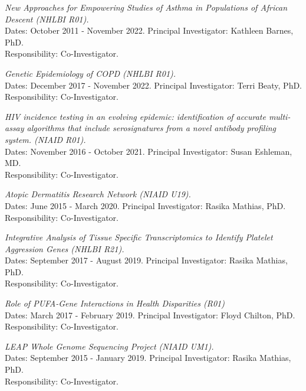 \documentclass[10pt]{article}
\newcommand{\dn}[1]{{\color{black} {#1}}}
\begin{document}
\item
{\it New Approaches for Empowering Studies of Asthma in Populations of African Descent (NHLBI R01).}\\[0.0em]
\dn{Dates:} October 2011 - November 2022.
\dn{Principal Investigator:} Kathleen Barnes, PhD.\\
\dn{Responsibility:} Co-Investigator.

\item
{\it Genetic Epidemiology of COPD (NHLBI R01).}\\[0.0em]
\dn{Dates:} December 2017 - November 2022.
\dn{Principal Investigator:} Terri Beaty, PhD.\\
\dn{Responsibility:} Co-Investigator.

\item
{\it HIV incidence testing in an evolving epidemic: identification of accurate multi-assay algorithms that include serosignatures from a novel antibody profiling system.
(NIAID R01).}\\[0.0em]
\dn{Dates:} November 2016 - October 2021.
\dn{Principal Investigator:} Susan Eshleman, MD.\\
\dn{Responsibility:} Co-Investigator.

\item
{\it Atopic Dermatitis Research Network (NIAID U19).}\\[0.0em]
\dn{Dates:} June 2015 - March 2020.
\dn{Principal Investigator:} Rasika Mathias, PhD.\\
\dn{Responsibility:} Co-Investigator.

\item
{\it Integrative Analysis of Tissue Specific Transcriptomics to Identify Platelet Aggression Genes (NHLBI R21).}\\[0.0em]
\dn{Dates:} September 2017 - August 2019.
\dn{Principal Investigator:} Rasika Mathias, PhD.\\
\dn{Responsibility:} Co-Investigator.

\item
{\it Role of PUFA-Gene Interactions in Health Disparities (R01)}\\[0.0em]
\dn{Dates:} March 2017 - February 2019.
\dn{Principal Investigator:} Floyd Chilton, PhD.\\
\dn{Responsibility:} Co-Investigator.

\item
{\it LEAP Whole Genome Sequencing Project (NIAID UM1).}\\[0.0em]
\dn{Dates:} September 2015 - January 2019.
\dn{Principal Investigator:} Rasika Mathias, PhD.\\
\dn{Responsibility:} Co-Investigator.
\end{document}
